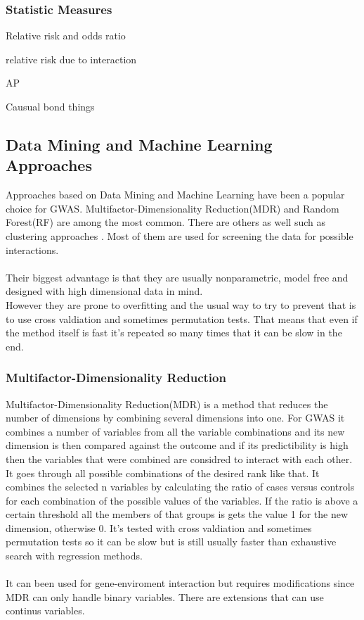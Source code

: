 \documentclass[10pt,a4paper]{article}
\begin{document}
\subsubsection{Statistic Measures}
Relative risk and odds ratio\cite{agresti_categorical}

relative risk due to interaction

AP

Causual bond things

\subsection{Data Mining and Machine Learning Approaches}
\label{data_machine_learning}
Approaches based on Data Mining and Machine Learning have been a popular choice for GWAS. Multifactor-Dimensionality Reduction(MDR)\cite{mdr_2001} and Random Forest(RF)\cite{random_forest} are among the most common\cite{gene_enviroment_2013,cordell_detect_review}. There are others as well such as clustering approaches \cite{fast_high_order_cluster}. Most of them are used for screening the data for possible interactions\cite{gene_enviroment_2013,cordell_detect_review}.\\
\\
Their biggest advantage is that they are usually nonparametric, model free and designed with high dimensional data in mind.
\\
However they are prone to overfitting and the usual way to try to prevent that is to use cross valdiation and sometimes permutation tests. That means that even if the method itself is fast it's repeated so many times that it can be slow in the end\cite{cordell_detect_review}.

\subsubsection{Multifactor-Dimensionality Reduction}
Multifactor-Dimensionality Reduction(MDR) is a method that reduces the number of dimensions by combining several dimensions into one. For GWAS it combines a number of variables from all the variable combinations and its new dimension is then compared against the outcome and if its predictibility is high then the variables that were combined are considred to interact with each other. It goes through all possible combinations of the desired rank like that. It combines the selected n variables by calculating the ratio of cases versus controls for each combination of the possible values of the variables. If the ratio is above a certain threshold all the members of that groups is gets the value 1 for the new dimension, otherwise 0. It's tested with cross valdiation and sometimes permutation tests so it can be slow but is still usually faster than exhaustive search with regression methods.\cite{cordell_detect_review,mdr_2001}\\
\\
It can been used for gene-enviroment interaction but requires modifications since MDR can only handle binary variables. There are extensions that can use continus variables.\cite{gene_enviroment_2013}
\end{document}
